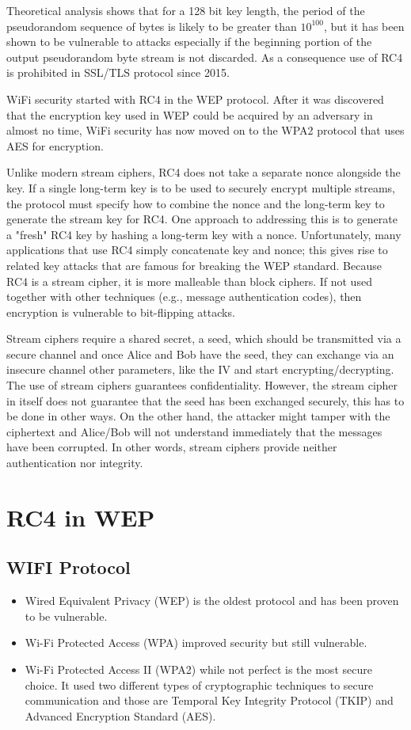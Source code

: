 Theoretical analysis shows that for a 128 bit key length, the period of the pseudorandom sequence of bytes is likely to be greater than $10^{100}$, but it has been shown to be vulnerable to attacks especially if the beginning portion of the output pseudorandom byte stream is not discarded. As a consequence use of RC4 is prohibited in SSL/TLS protocol since 2015. 

WiFi security started with RC4 in the WEP protocol. After it was discovered that the encryption key used in WEP could be acquired by an adversary in almost no time, WiFi security has now moved on to the WPA2 protocol that uses AES for encryption.

Unlike modern stream ciphers, RC4 does not take a separate nonce alongside the key. If a single long-term key is to be used to securely encrypt multiple streams, the protocol must specify how to combine the nonce and the long-term key to generate the stream key for RC4. One approach to addressing this is to generate a "fresh" RC4 key by hashing a long-term key with a nonce. Unfortunately, many applications that use RC4 simply concatenate key and nonce; this gives rise to related key attacks that are famous for breaking the WEP standard.
Because RC4 is a stream cipher, it is more malleable than block ciphers. If not used together with other techniques (e.g., message authentication codes), then encryption is vulnerable to bit-flipping attacks.

Stream ciphers require a shared secret, a seed, which should be transmitted via a secure channel and once Alice and Bob have the seed, they can exchange via an insecure channel other parameters, like the IV and start encrypting/decrypting. The use of stream ciphers guarantees confidentiality. However, the stream cipher in itself does not guarantee that the seed has been exchanged securely, this has to be done in other ways. On the other hand, the attacker might tamper with the ciphertext and Alice/Bob will not understand immediately that the messages have been corrupted. In other words, stream ciphers provide neither authentication nor integrity.


\section{RC4 in WEP}

\subsection{WIFI Protocol}
\begin{itemize}
	\item Wired Equivalent Privacy (WEP) is the oldest protocol and has been proven to be vulnerable.
	\item Wi-Fi Protected Access (WPA) improved security but still vulnerable.
	\item Wi-Fi Protected Access II (WPA2) while not perfect is the most secure choice. It used two different types of cryptographic techniques to secure communication and those are Temporal Key Integrity Protocol (TKIP) and Advanced Encryption Standard (AES).
\end{itemize}

